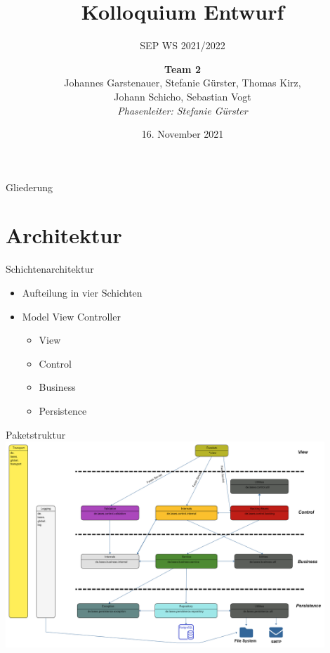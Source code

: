 \documentclass{beamer}
\title{Kolloquium Entwurf}
\subtitle{SEP WS 2021/2022}
\date{\small 16. November 2021}
\author{\textbf{Team 2} \\ \small {Johannes Garstenauer, Stefanie Gürster, Thomas Kirz,\\ Johann Schicho, Sebastian Vogt} \\ \vspace{0.5cm}\emph{Phasenleiter: Stefanie Gürster}\normalsize}
\begin{document}
    \begin{frame}
        \titlepage
    \end{frame}

    \begin{frame}{Gliederung}
        \tableofcontents
    \end{frame}




    \section{Architektur}

    \begin{frame}{Schichtenarchitektur}
        \begin{itemize}

            \item Aufteilung in vier Schichten \pause
            \item Model View Controller
            \pause
            \begin{itemize}
                \item View
                \item Control
                \item Business
                \item Persistence
            \end{itemize}

        \end{itemize}
    \end{frame}

    \begin{frame}{Paketstruktur}
        \centering
        \includegraphics[width=0.9\textwidth]{../../docs/Entwurf/graphics/Paketdiagramm9.0.png}
    \end{frame}
\end{document}
